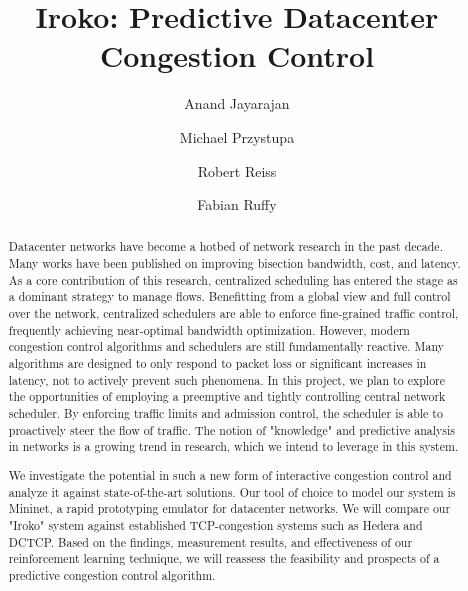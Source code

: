 \documentclass[sigconf]{acmart}
\begin{document}
\title{Iroko: Predictive Datacenter Congestion Control}

\author{Anand Jayarajan}

\author{Michael Przystupa}

\author{Robert Reiss}

\author{Fabian Ruffy}

\begin{abstract}
Datacenter networks have become a hotbed of network research in the past 
decade. Many works have been published on improving bisection bandwidth, cost, 
and latency. As a core contribution of this research, centralized scheduling 
has entered the stage as a dominant strategy to manage flows. Benefitting from 
a global view and full control over the network, centralized schedulers are 
able to enforce fine-grained traffic control, frequently achieving near-optimal 
bandwidth optimization. However, modern congestion control algorithms and 
schedulers are still fundamentally reactive. Many algorithms are designed to 
only respond to packet loss or significant increases in latency, not to actively 
prevent such phenomena.
In this project, we plan to explore the opportunities of employing a preemptive 
and tightly controlling central network scheduler. By enforcing traffic limits 
and admission control, the scheduler is able to proactively steer the flow of 
traffic. The notion of "knowledge" and predictive analysis in networks is a 
growing trend in research, which we intend to leverage in this system.

We investigate the potential in such a new form of interactive congestion 
control and analyze it against state-of-the-art solutions. Our tool of choice 
to model our system is Mininet, a rapid prototyping emulator for datacenter 
networks. We will compare our "Iroko" system against established TCP-congestion 
systems such as Hedera and DCTCP. Based on the findings, measurement results, 
and effectiveness of our reinforcement learning technique, we will reassess the 
feasibility and prospects of a predictive congestion control algorithm.
\end{abstract}





\maketitle













 
\end{document}
